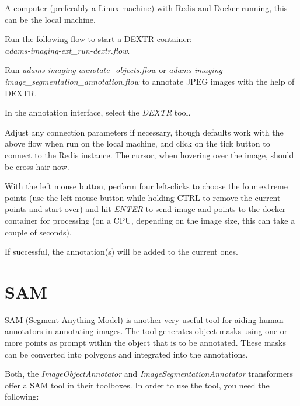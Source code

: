 \documentclass[a4paper]{book}
\begin{document}
\begin{tight_itemize}
  \item A computer (preferably a Linux machine) with Redis\cite{redis} and Docker\cite{docker} running,
  this can be the local machine.
  \item Run the following flow to start a DEXTR container: \\
  \textit{adams-imaging-ext\_run-dextr.flow}.
  \item Run \textit{adams-imaging-annotate\_objects.flow} or \textit{adams-imaging-image\_segmentation\_annotation.flow}
  to annotate JPEG images with the help of DEXTR.
  \begin{tight_itemize}
    \item In the annotation interface, select the \textit{DEXTR} tool.
    \item Adjust any connection parameters if necessary, though defaults work with the above flow when run on the
    local machine, and click on the tick button to connect to the Redis instance. The cursor, when hovering over
    the image, should be cross-hair now.
    \item With the left mouse button, perform four left-clicks to choose the four extreme points (use the left mouse
    button while holding CTRL to remove the current points and start over) and hit \textit{ENTER} to send image and
    points to the docker container for processing (on a CPU, depending on the image size, this can take a couple of seconds).
    \item If successful, the annotation(s) will be added to the current ones.
  \end{tight_itemize}
\end{tight_itemize}


\newpage
\section{SAM}
SAM\cite{sam} (Segment Anything Model) is another very useful tool for aiding human annotators in
annotating images. The tool generates object masks using one or more points as prompt
within the object that is to be annotated. These masks can be converted into polygons
and integrated into the annotations.

Both, the \textit{ImageObjectAnnotator} and \textit{ImageSegmentationAnnotator} transformers offer a SAM
tool in their toolboxes. In order to use the tool, you need the following:
\end{document}
